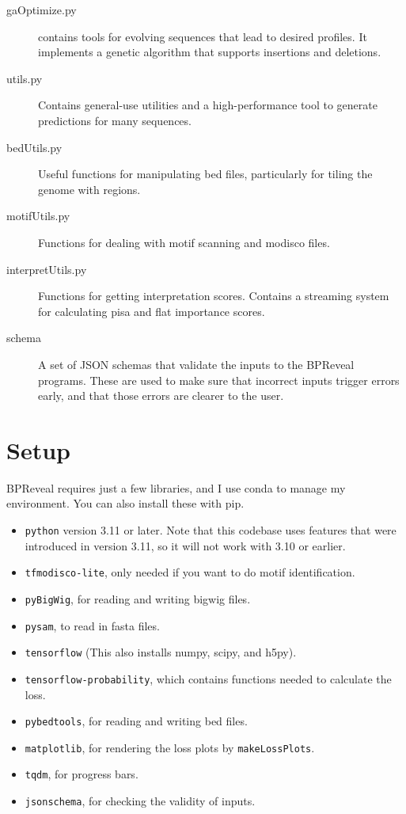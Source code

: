 \documentclass{article}
\begin{document}
\begin{description}
    \item [gaOptimize.py] contains tools for evolving sequences that lead to
        desired profiles.
        It implements a genetic algorithm that supports insertions and
        deletions.
    \item [utils.py] Contains general-use utilities and a high-performance tool
        to generate predictions for many sequences.
    \item [bedUtils.py] Useful functions for manipulating bed files,
        particularly for tiling the genome with regions.
    \item [motifUtils.py] Functions for dealing with motif scanning and modisco
        files.
    \item [interpretUtils.py] Functions for getting interpretation scores.
        Contains a streaming system for calculating pisa and flat importance
        scores.
    \item [schema] A set of JSON schemas that validate the inputs to the
        BPReveal programs. These are used to make sure that incorrect inputs
        trigger errors early, and that those errors are clearer to the user.
\end{description}

\newpage

\section{Setup}

BPReveal requires just a few libraries, and I use conda to manage my
environment.
You can also install these with pip.

\begin{itemize}
    \item \texttt{python} version 3.11 or later. Note that this codebase uses
        features that were introduced in version 3.11, so it will not work
        with 3.10 or earlier.
    \item \texttt{tfmodisco-lite}, only needed if you want to do motif
        identification.
    \item \texttt{pyBigWig}, for reading and writing bigwig files.
    \item \texttt{pysam}, to read in fasta files.
    \item \texttt{tensorflow} (This also installs numpy, scipy, and h5py).
    \item \texttt{tensorflow-probability}, which contains functions needed to
        calculate the loss.
    \item \texttt{pybedtools}, for reading and writing bed files.
    \item \texttt{matplotlib}, for rendering the loss plots
        by \texttt{makeLossPlots}.
    \item \texttt{tqdm}, for progress bars.
    \item \texttt{jsonschema}, for checking the validity of inputs.
\end{itemize}
\end{document}
